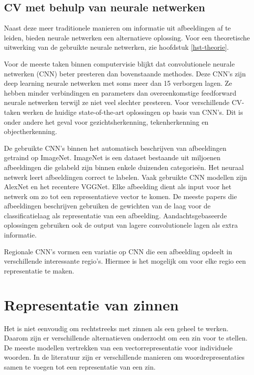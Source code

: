 
\subsection{CV met behulp van neurale netwerken}
Naast deze meer traditionele manieren om informatie uit afbeeldingen af te leiden, bieden neurale netwerken een alternatieve oplossing. Voor een theoretische uitwerking van de gebruikte neurale netwerken, zie hoofdstuk \ref{hst-theorie}.

Voor de meeste taken binnen computervisie blijkt dat convolutionele neurale netwerken (CNN) beter presteren dan bovenstaande methodes. Deze CNN's zijn deep learning neurale netwerken met soms meer dan 15 verborgen lagen. Ze hebben minder verbindingen en parameters dan overeenkomstige feedforward neurale netwerken terwijl ze niet veel slechter presteren\cite{Krizhevsky2012a}. 
Voor verschillende CV-taken werken de huidige state-of-the-art oplossingen op basis van CNN's. Dit is onder andere het geval voor gezichtsherkenning\cite{Zhou2015}, tekenherkenning\cite{Ciresan2012} en objectherkenning\cite{Szegedy2014}.

De gebruikte CNN's binnen het automatisch beschrijven van afbeeldingen getraind op ImageNet\cite{Russakovsky2014}. ImageNet is een dataset bestaande uit miljoenen afbeeldingen die gelabeld zijn binnen enkele duizenden categorie\"en. Het neuraal netwerk leert afbeeldingen correct te labelen. Vaak gebruikte CNN modellen zijn AlexNet\cite{Krizhevsky2012a} en het recentere VGGNet\cite{Arge2015}. Elke afbeelding dient als input voor het netwerk om zo tot een representatieve vector te komen. De meeste papers die afbeeldingen beschrijven gebruiken de gewichten van de laag voor de classificatielaag als representatie van een afbeelding\cite{Chen2014,Karpathy2015,Mao2014a,Google}. Aandachtsgebaseerde oplossingen\cite{Jin2015,Xu2015} gebruiken ook de output van lagere convolutionele lagen als extra informatie.

Regionale CNN's vormen een variatie op CNN die een afbeelding opdeelt in verschillende interessante regio's. Hiermee is het mogelijk om voor elke regio een representatie te maken\cite{Karpathy2015,Mitchell2015}. 

\section{Representatie van zinnen}
Het is niet eenvoudig om rechtstreeks met zinnen als een geheel te werken. Daarom zijn er verschillende alternatieven onderzocht om een zin voor te stellen.
De meeste modellen vertrekken van een vectorrepresentatie voor individuele woorden. In de literatuur zijn er verschillende manieren om woordrepresentaties samen te voegen tot een representatie van een zin.

